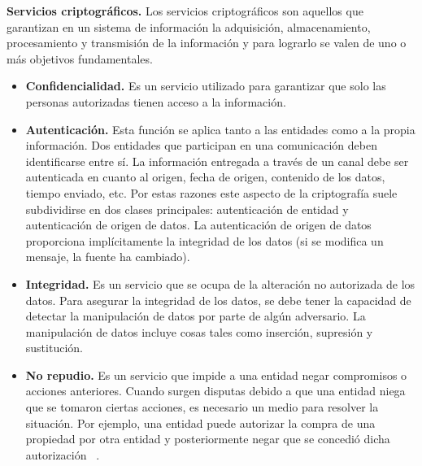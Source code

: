 \textbf{Servicios criptográficos. }
Los servicios criptográficos son aquellos que garantizan en un sistema de información la adquisición, almacenamiento, procesamiento y transmisión de la información y para lograrlo se valen de uno o más objetivos fundamentales. 
 \begin{itemize}
	\item \textbf{Confidencialidad. }
Es un servicio utilizado para garantizar que solo las personas autorizadas tienen acceso a la información.

	\item \textbf{Autenticación. }
Esta función se aplica tanto a las entidades como a la propia información. Dos entidades que participan en una comunicación deben identificarse entre sí. La información entregada a través de un canal debe ser autenticada en cuanto al origen, fecha de origen, contenido de los datos, tiempo enviado, etc. Por estas razones este aspecto de la criptografía suele subdividirse en dos clases principales: autenticación de entidad y autenticación de origen de datos. La autenticación de origen de datos proporciona implícitamente la integridad de los datos (si se modifica un mensaje, la fuente ha cambiado).

	\item \textbf{Integridad. }
Es un servicio que se ocupa de la alteración no autorizada de los datos. Para asegurar la integridad de los datos, se debe tener la capacidad de detectar la manipulación de datos por parte de algún adversario. La manipulación de datos incluye cosas tales como inserción, supresión y sustitución.  

	\item \textbf{No repudio. }
Es un servicio que impide a una entidad negar compromisos o acciones anteriores. Cuando surgen disputas debido a que una entidad niega que se tomaron ciertas acciones, es necesario un medio para resolver la situación. Por ejemplo, una entidad puede autorizar la compra de una propiedad por otra entidad y posteriormente negar que se concedió dicha autorización ~\cite{menezes}.
 \end{itemize}

